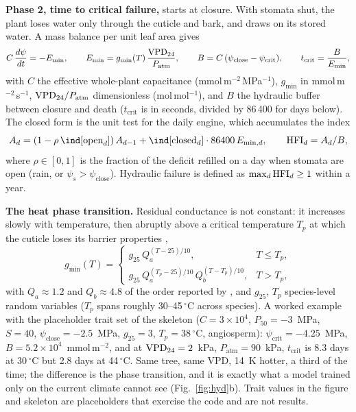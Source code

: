 \textbf{Phase 2, time to critical failure,} starts at closure. With stomata shut, the plant loses water only through the cuticle and bark, and draws on its stored water. A mass balance per unit leaf area gives
\begin{equation}\label{eq:massbal}
C\,\frac{d\psi}{dt}=-E_{\min},\qquad E_{\min}=g_{\min}(T)\,\frac{\mathrm{VPD}_{24}}{P_{\text{atm}}},\qquad B=C\,(\psi_{\text{close}}-\psi_{\text{crit}}),\qquad t_{\text{crit}}=\frac{B}{E_{\min}},
\end{equation}
with $C$ the effective whole-plant capacitance (mmol\,m$^{-2}$\,MPa$^{-1}$), $g_{\min}$ in mmol\,m$^{-2}$\,s$^{-1}$, $\mathrm{VPD}_{24}/P_{\text{atm}}$ dimensionless (mol\,mol$^{-1}$), and $B$ the hydraulic buffer between closure and death ($t_{\text{crit}}$ is in seconds, divided by 86\,400 for days below). The closed form \citep[cf.][]{MartinStPaul2017} is the unit test for the daily engine, which accumulates the index
\begin{equation}\label{eq:hfi}
A_d=(1-\rho\,\ind[\text{open}_d])\,A_{d-1}+\ind[\text{closed}_d]\cdot86400\,E_{\min,d},\qquad \HFI_d=A_d/B,
\end{equation}
where $\rho\in[0,1]$ is the fraction of the deficit refilled on a day when stomata are open (rain, or ${\psi_s>\psi_{\text{close}}}$). Hydraulic failure is defined as $\max_d\mathrm{HFI}_d\ge1$ within a year.

\textbf{The heat phase transition.} Residual conductance is not constant: it increases slowly with temperature, then abruptly above a critical temperature $T_p$ at which the cuticle loses its barrier properties \citep{Cochard2019,Duursma2019},
\begin{equation}\label{eq:gmin}
g_{\min}(T)=\begin{cases}g_{25}\,Q_a^{(T-25)/10}, & T\le T_p,\\[2pt] g_{25}\,Q_a^{(T_p-25)/10}\,Q_b^{(T-T_p)/10}, & T>T_p,\end{cases}
\end{equation}
with $Q_a\approx1.2$ and $Q_b\approx4.8$ of the order reported by \citet{Cochard2019}, and $g_{25}$, $T_p$ species-level random variables ($T_p$ spans roughly 30--45\,$^\circ$C across species). A worked example with the placeholder trait set of the skeleton ($C=3\times10^4$, $P_{50}=-3$~MPa, $S=40$, $\psi_{\text{close}}=-2.5$~MPa, $g_{25}=3$, $T_p=38\,^\circ$C, angiosperm): $\psi_{\text{crit}}=-4.25$~MPa, $B=5.2\times10^4$~mmol\,m$^{-2}$, and at $\mathrm{VPD}_{24}=2$~kPa, $P_{\text{atm}}=90$~kPa, $t_{\text{crit}}$ is 8.3 days at 30\,$^\circ$C but 2.8 days at 44\,$^\circ$C. Same tree, same VPD, 14~K hotter, a third of the time; the difference is the phase transition, and it is exactly what a model trained only on the current climate cannot see (Fig.~\ref{fig:hyd}b). Trait values in the figure and skeleton are placeholders that exercise the code and are not results.

